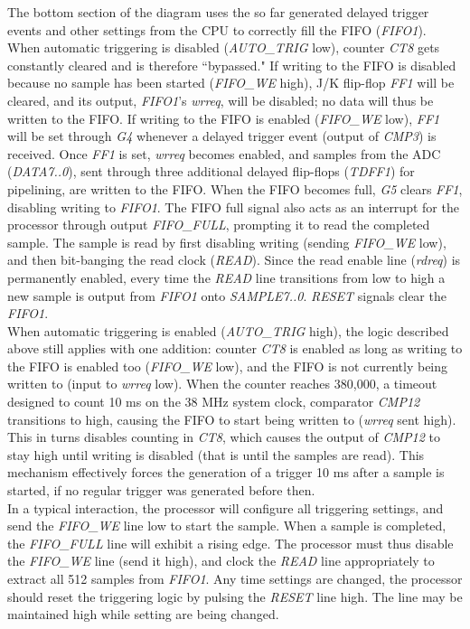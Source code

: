 \documentclass[titlepage]{scrartcl}
\begin{document}
	The bottom section of the diagram uses the so far generated delayed trigger events and other settings from the CPU to correctly fill the FIFO (\textit{FIFO1}). When automatic triggering is disabled (\textit{AUTO\_TRIG} low), counter \textit{CT8} gets constantly cleared and is therefore ``bypassed." If writing to the FIFO is disabled because no sample has been started (\textit{FIFO\_WE} high), J/K flip-flop \textit{FF1} will be cleared, and its output, \textit{FIFO1}'s \textit{wrreq}, will be disabled; no data will thus be written to the FIFO. If writing to the FIFO is enabled (\textit{FIFO\_WE} low), \textit{FF1} will be set through \textit{G4} whenever a delayed trigger event (output of \textit{CMP3}) is received. Once \textit{FF1} is set, \textit{wrreq} becomes enabled, and samples from the ADC (\textit{DATA7..0}), sent through three additional delayed flip-flops (\textit{TDFF1}) for pipelining, are written to the FIFO. When the FIFO becomes full, \textit{G5} clears \textit{FF1}, disabling writing to \textit{FIFO1}. The FIFO full signal also acts as an interrupt for the processor through output \textit{FIFO\_FULL}, prompting it to read the completed sample. The sample is read by first disabling writing (sending \textit{FIFO\_WE} low), and then bit-banging the read clock (\textit{READ}). Since the read enable line (\textit{rdreq}) is permanently enabled, every time the \textit{READ} line transitions from low to high a new sample is output from \textit{FIFO1} onto \textit{SAMPLE7..0}. \textit{RESET} signals clear the \textit{FIFO1}.\\

	When automatic triggering is enabled (\textit{AUTO\_TRIG} high), the logic described above still applies with one addition: counter \textit{CT8} is enabled as long as writing to the FIFO is enabled too (\textit{FIFO\_WE} low), and the FIFO is not currently being written to (input to \textit{wrreq} low). When the counter reaches 380,000, a timeout designed to count 10 ms on the 38 MHz system clock, comparator \textit{CMP12} transitions to high, causing the FIFO to start being written to (\textit{wrreq} sent high). This in turns disables counting in \textit{CT8}, which causes the output of \textit{CMP12} to stay high until writing is disabled (that is until the samples are read). This mechanism effectively forces the generation of a trigger 10 ms after a sample is started, if no regular trigger was generated before then.\\

	In a typical interaction, the processor will configure all triggering settings, and send the \textit{FIFO\_WE} line low to start the sample. When a sample is completed, the \textit{FIFO\_FULL} line will exhibit a rising edge. The processor must thus disable the \textit{FIFO\_WE} line (send it high), and clock the \textit{READ} line appropriately to extract all 512 samples from \textit{FIFO1}. Any time settings are changed, the processor should reset the triggering logic by pulsing the \textit{RESET} line high. The line may be maintained high while setting are being changed.\\
\end{document}
